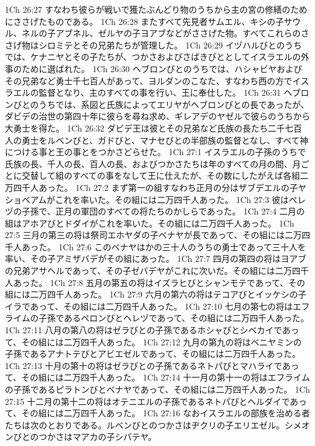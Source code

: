 1Ch 26:27  すなわち彼らが戦いで獲たぶんどり物のうちから主の宮の修繕のためにささげたものである。
1Ch 26:28  またすべて先見者サムエル、キシの子サウル、ネルの子アブネル、ゼルヤの子ヨアブなどがささげた物。すべてこれらのささげ物はシロミテとその兄弟たちが管理した。
1Ch 26:29  イヅハルびとのうちでは、ケナニヤとその子たちが、つかさおよびさばきびととしてイスラエルの外事のために選ばれた。
1Ch 26:30  ヘブロンびとのうちでは、ハシャビヤおよびその兄弟など勇士千七百人があって、ヨルダンのこなた、すなわち西の方でイスラエルの監督となり、主のすべての事を行い、王に奉仕した。
1Ch 26:31  ヘブロンびとのうちでは、系図と氏族によってエリヤがヘブロンびとの長であったが、ダビデの治世の第四十年に彼らを尋ね求め、ギレアデのヤゼルで彼らのうちから大勇士を得た。
1Ch 26:32  ダビデ王は彼とその兄弟など氏族の長たち二千七百人の勇士をルベンびと、ガドびと、マナセびとの半部族の監督となし、すべて神につける事と王の事とをつかさどらせた。
1Ch 27:1  イスラエルの子孫のうちで氏族の長、千人の長、百人の長、およびつかさたちは年のすべての月の間、月ごとに交替して組のすべての事をなして王に仕えたが、その数にしたがえば各組二万四千人あった。
1Ch 27:2  まず第一の組すなわち正月の分はザブデエルの子ヤショベアムがこれを率いた。その組には二万四千人あった。
1Ch 27:3  彼はペレヅの子孫で、正月の軍団のすべての将たちのかしらであった。
1Ch 27:4  二月の組はアホアびとドダイがこれを率いた。その組には二万四千人あった。
1Ch 27:5  三月の第三の将は祭司エホヤダの子ベナヤが長であって、その組には二万四千人あった。
1Ch 27:6  このベナヤはかの三十人のうちの勇士であって三十人を率い、その子アミザバデがその組にあった。
1Ch 27:7  四月の第四の将はヨアブの兄弟アサヘルであって、その子ゼバデヤがこれに次いだ。その組には二万四千人あった。
1Ch 27:8  五月の第五の将はイズラヒびとシャンモテであって、その組には二万四千人あった。
1Ch 27:9  六月の第六の将はテコアびとイッケシの子イラであって、その組には二万四千人あった。
1Ch 27:10  七月の第七の将はエフライムの子孫であるペロンびとヘレヅであって、その組には二万四千人あった。
1Ch 27:11  八月の第八の将はゼラびとの子孫であるホシャびとシベカイであって、その組には二万四千人あった。
1Ch 27:12  九月の第九の将はベニヤミンの子孫であるアナトテびとアビエゼルであって、その組には二万四千人あった。
1Ch 27:13  十月の第十の将はゼラびとの子孫であるネトパびとマハライであって、その組には二万四千人あった。
1Ch 27:14  十一月の第十一の将はエフライムの子孫であるピラトンびとベナヤであって、その組には二万四千人あった。
1Ch 27:15  十二月の第十二の将はオテニエルの子孫であるネトパびとヘルダイであって、その組には二万四千人あった。
1Ch 27:16  なおイスラエルの部族を治める者たちは次のとおりである。ルベンびとのつかさはヂクリの子エリエゼル。シメオンびとのつかさはマアカの子シパテヤ。

